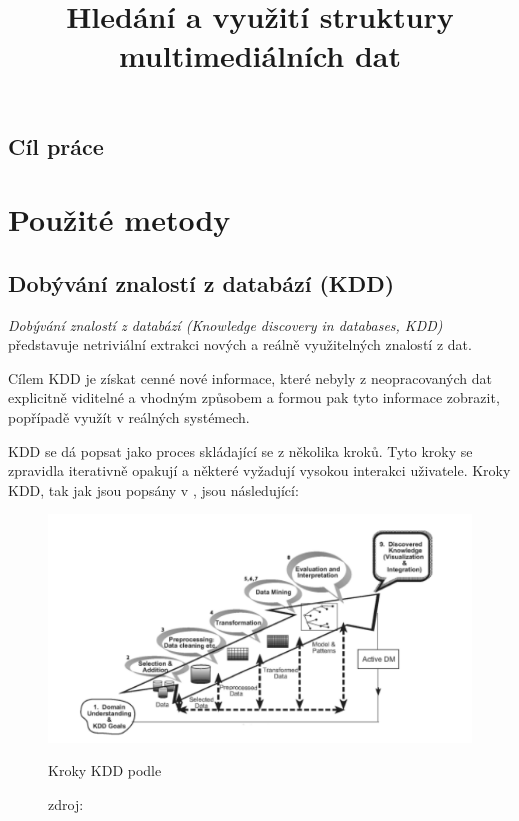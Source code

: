 \documentclass[thesis=M,czech]{FITthesis}[2012/06/26]
\title{Hledání a využití struktury multimediálních dat}
\begin{document}
\renewcommand\listingscaption{Ukázka}

\begin{introduction}
	
	\section{Cíl práce}
\end{introduction}

\chapter{Použité metody}
\section{Dobývání znalostí z databází (KDD)}
\textit{Dobývání znalostí z databází (Knowledge discovery in databases, KDD)} představuje netriviální extrakci nových a reálně využitelných znalostí z dat\cite{kddb}. 

Cílem KDD je získat cenné nové informace, které nebyly z neopracovaných dat explicitně viditelné a vhodným způsobem a formou pak tyto informace zobrazit, popřípadě využít v reálných systémech.\cite{fayyad}

KDD se dá popsat jako proces skládající se z několika kroků. Tyto kroky se zpravidla iterativně opakují a některé vyžadují vysokou interakci uživatele. Kroky KDD, tak jak jsou popsány v \cite{hbcap}, jsou následující:

\begin{figure}[htbp]
\begin{center}
	\includegraphics[scale=0.75]{kdd_steps}
\caption{Kroky KDD podle \cite{fayyad}}
\end{center}
  \caption*{zdroj: \cite{fayyad}}
\end{figure}
\end{document}
